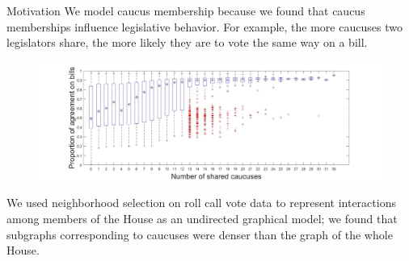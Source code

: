 \documentclass[final]{beamer}
\newlength{\onecolwid}
\begin{document}
\begin{frame}[t]
\begin{columns}[t]
\begin{column}{\onecolwid}
\begin{block}{Motivation}
We model caucus membership because we found that caucus memberships influence legislative behavior. For example, the more caucuses two legislators share, the more likely they are to vote the same way on a bill. 

\begin{figure}[h]
  \centering
        \includegraphics[width=\textwidth]{Caucus_vs_Votes.jpg}
\end{figure}


We used neighborhood selection on roll call vote data to represent interactions among members of the House as an undirected graphical model; we found that subgraphs corresponding to caucuses were denser than the graph of the whole House. 




\end{block}
\end{column}
\end{columns}
\end{frame}
\end{document}
